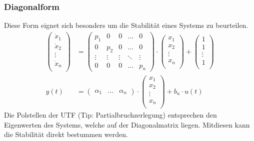 \subsubsection{Diagonalform}\label{diag}
Diese Form eignet sich besonders um die Stabilität eines Systems zu beurteilen. 
\begin{align*}
	\begin{pmatrix}  \dot{x}_1 \\ 	\dot{x}_2 \\ \vdots \\ \dot{x}_n \\ \end{pmatrix}
	&=
	\begin{pmatrix}
		p_1 & 0 & 0 & \dots & 0\\
		0 & p_2 & 0 & \dots & 0\\
		\vdots & \vdots & \vdots & \ddots & \vdots \\
		0 & 0 & 0 & \dots & p_{n}
	\end{pmatrix}\cdot
	\begin{pmatrix}  {x}_1 \\ 	{x}_2 \\ \vdots\\ {x}_n \\ \end{pmatrix} +
	\begin{pmatrix}  1 \\ 1 \\ \vdots \\1 \\ \end{pmatrix}
	\\
	y(t) &= \begin{pmatrix}
		\alpha_1 & \dots & \alpha_n
	\end{pmatrix}\cdot
	\begin{pmatrix}  {x}_1 \\ 	{x}_2 \\ \vdots\\ {x}_n \\ \end{pmatrix}
	+ {b_n}\cdot u(t)
\end{align*}
Die Polstellen der UTF (Tip: Partialbruchzerlegung) entsprechen den Eigenwerten des Systems, welche auf der Diagonalmatrix liegen. Mitdiesen kann die Stabilität direkt bestummen werden.

